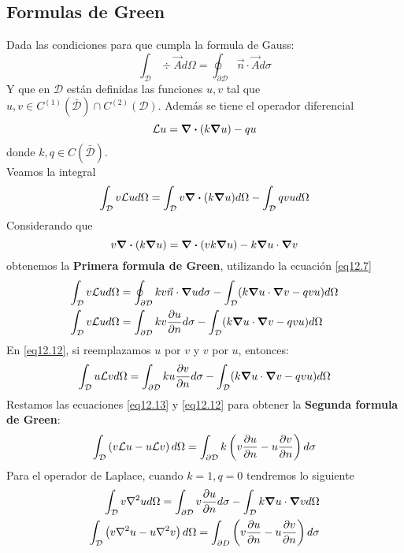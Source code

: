 \documentclass[../main]{subfiles}
\begin{document}
\subsection{Formulas de Green}
Dada las condiciones para que cumpla la formula de Gauss:
\begin{equation}
    \int_{\mathcal{D}} \div{\Vec{A}}d\Omega=\oint_{\partial \mathcal{D}} \vec{n} \cdot \Vec{A} d\sigma
    \label{eq12.7}
\end{equation}
Y que en $\mathcal{D}$ están definidas las funciones $u, v$ tal que $u, v \in C^{(1)}(\bar{\mathcal{D}}) \cap C^{(2)}(\mathcal{D})$. Además se tiene el operador diferencial
\begin{equation}
    \mathcal{L}u=\div{(k \grad{u})}-qu
\end{equation}
donde $k,q \in C(\bar{\mathcal{D}})$.
\\[0.3cm]
Veamos la integral
\begin{equation}
    \int_{\mathcal{D}} v\mathcal{L} u d\Omega=\int_{\mathcal{D}} v \div{(k\grad{u})}d\Omega-\int_{\mathcal{D}}qvud\Omega
\end{equation}
Considerando que
\begin{equation}
    v\div{(k\grad{u})}=\div{(vk\grad{u})}-k\grad{u}\cdot \grad{v}
\end{equation}
obtenemos la \textbf{Primera formula de Green}, utilizando la ecuación \eqref{eq12.7}
\begin{align}
    \int_{\mathcal{D}} v \mathcal{L} u d\Omega & = \oint_{\partial \mathcal{D}} kv\Vec{n}\cdot \grad{u} d\sigma-\int_{\mathcal{D}}(k\grad{u}\cdot \grad{v}-qvu)d\Omega \\
    \int_{\mathcal{D}} v \mathcal{L} u d\Omega & =\int_{\partial \mathcal{D}} kv\pdv{u}{n} d\sigma-\int_{\mathcal{D}} (k\grad{u}\cdot \grad{v}-qvu)d\Omega
    \label{eq12.12}
\end{align}
En \eqref{eq12.12}, si reemplazamos $u$ por $v$ y $v$ por $u$, entonces:
\begin{equation}
    \int_{\mathcal{D}} u \mathcal{L} v d\Omega  =\int_{\partial \mathcal{D}} ku\pdv{v}{n} d\sigma-\int_{\mathcal{D}} (k\grad{u}\cdot \grad{v}-qvu)d\Omega
    \label{eq12.13}
\end{equation}
Restamos las ecuaciones \eqref{eq12.13} y \eqref{eq12.12} para obtener la \textbf{Segunda formula de Green}:
\begin{equation}
    \int_{\mathcal{D}}\left( v\mathcal{L}u-u\mathcal{L}v\right)d\Omega= \int_{\partial \mathcal{D}} k \left( v \pdv{u}{n}-u\pdv{v}{n}\right) d\sigma
\end{equation}
Para el operador de Laplace, cuando $k=1, q=0$ tendremos lo siguiente
\begin{align}
    \int_{\mathcal{D}} v \nabla^2 u d\Omega=\int_{\partial \mathcal{D}} v \pdv{u}{n} d\sigma-\int_{\mathcal{D}} k \grad{u} \cdot \grad{v} d\Omega \\
    \int_{\mathcal{D}} \left(v\nabla^2 u-u\nabla^2 v\right) d\Omega=\int_{\partial D} \left( v\pdv{u}{n}-u\pdv{v}{n}\right) d\sigma
\end{align}
\end{document}
